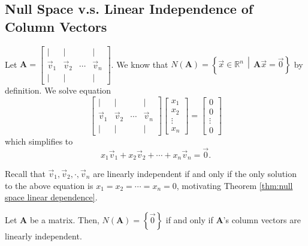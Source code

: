 \documentclass[]{book}
\newcommand{\vecn}[1]{\ensuremath{\vec{v}_{#1}}}
\newcommand{\suchthat}{\,\middle|\,}
\newcommand{\mat}[1]{\ensuremath{\mathbf{#1}}}
\newcommand{\cmat}[1][v]{\begin{bmatrix}
        \vert & \vert & & \vert \\
        \vec{#1}_1 & \vec{#1}_2 & \cdots & \vec{#1}_n \\
        \vert & \vert & & \vert
    \end{bmatrix}
}
\begin{document}
\subsection{Null Space v.s. Linear Independence of Column Vectors}
Let $\mathbf{A}=\cmat$. We know that $N(\mat{A}) = \left\{\vec{x} \in \mathbb{R}^n \suchthat \mat{A}\vec{x} = \vec{0}\right\}$ by definition. We solve equation
\[
    \begin{bmatrix}
        \vert & \vert & & \vert \\
        \vecn{1} & \vecn{2} & \cdots & \vecn{n} \\
        \vert & \vert & & \vert
    \end{bmatrix} \begin{bmatrix}x_1 \\ x_2 \\ \vdots \\ x_n \end{bmatrix} = \begin{bmatrix}0 \\ 0 \\ \vdots \\ 0\end{bmatrix}
\]
which simplifies to
\[x_1\vecn{1} + x_2\vecn{2} + \cdots + x_n\vecn{n} = \vec{0}.\]

Recall that $\vecn{1},\vecn{2},\cdot, \vecn{n}$ are linearly independent if and only if the only solution to the above equation is $x_1=x_2=\cdots=x_n=0$, motivating Theorem \ref{thm:null space linear dependence}.
\begin{theorem}
    \label{thm:null space linear dependence}
    Let $\mat{A}$ be a matrix. Then, $N(\mat{A}) = \left\{\vec{0}\right\}$ if and only if $\mat{A}$'s column vectors are linearly independent.
\end{theorem}
\end{document}
